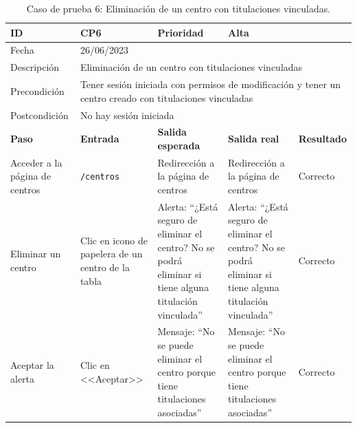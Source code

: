 \begin{table}[H]
\small
\begin{tabular}{p{} p{} p{} p{} p{}}
\cellcolor{gray!25}
ID   & CP6 & \cellcolor{gray!25} Prioridad   & Alta \\ \hline
\cellcolor{gray!25} Fecha	&	\multicolumn{4}{l}{26/06/2023} \\ \hline
\cellcolor{gray!25} Descripción		&	\multicolumn{4}{l}{Eliminación de un centro con titulaciones vinculadas} \\ \hline                                            
\cellcolor{gray!25}
Precondición  & \multicolumn{4}{p{.66\textwidth}}{Tener sesión iniciada con permisos de modificación y tener un centro creado con titulaciones vinculadas} \\ \hline
\cellcolor{gray!25} Postcondición & \multicolumn{4}{l}{No hay sesión iniciada}                                                    \\ \hline
\rowcolor{gray!25}
\textbf{Paso}   & \textbf{Entrada} & \textbf{Salida esperada} & \textbf{Salida real} & \textbf{Resultado} \\ \hline
Acceder a la página de centros 
& \texttt{/centros}                                                                             
& Redirección a la página de centros                                   
& Redirección a la página de centros                                   
& Correcto                            
\\ \hline
Eliminar un centro
& Clic en icono de papelera de un centro de la tabla
& Alerta: ``¿Está seguro de eliminar el centro? No se podrá eliminar si tiene alguna titulación vinculada''
& Alerta: ``¿Está seguro de eliminar el centro? No se podrá eliminar si tiene alguna titulación vinculada''                              
& Correcto
\\ \hline
Aceptar la alerta
& Clic en <<Aceptar>>
& Mensaje: ``No se puede eliminar el centro porque tiene titulaciones asociadas''                              
& Mensaje: ``No se puede eliminar el centro porque tiene titulaciones asociadas''                             
& Correcto                            
\\ \hline                
\end{tabular}
\caption{Caso de prueba 6: Eliminación de un centro con titulaciones vinculadas.}\label{table:CP6}
\end{table}

